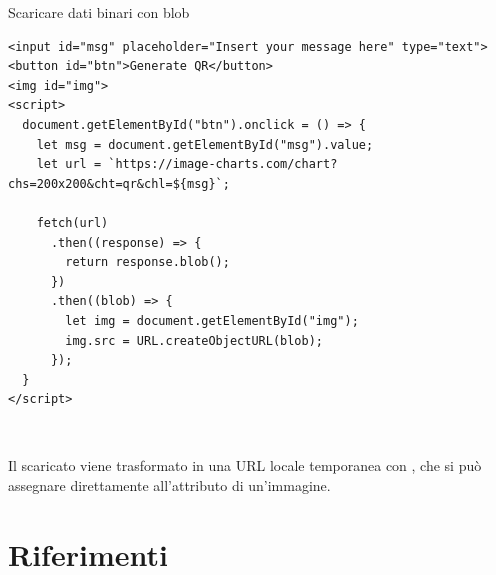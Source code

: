 \begin{esempio}{Scaricare dati binari con blob}
\begin{affianco}[0.62][c]
\codicepiccolo
\begin{lstlisting}[style=html, name=fetch-blob.html]
<input id="msg" placeholder="Insert your message here" type="text">
<button id="btn">Generate QR</button>
<img id="img">
<script>
  document.getElementById("btn").onclick = () => {
    let msg = document.getElementById("msg").value;
    let url = `https://image-charts.com/chart?chs=200x200&cht=qr&chl=${msg}`;

    fetch(url)
      .then((response) => {
        return response.blob();
      })
      .then((blob) => {
        let img = document.getElementById("img");
        img.src = URL.createObjectURL(blob);
      });
  }
</script>
\end{lstlisting}
\risultato
\begin{browser}
  \ \\[6pt]
\end{browser}
\end{affianco}

Il  scaricato viene trasformato in una URL locale temporanea con
, che si può assegnare direttamente all'attributo
 di un'immagine.
\end{esempio}

\section{Riferimenti}


